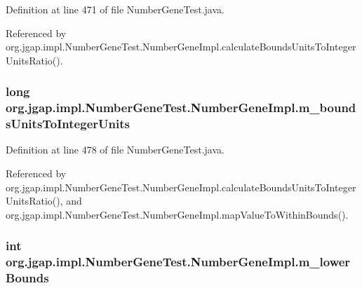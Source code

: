 Definition at line 471 of file Number\-Gene\-Test.\-java.



Referenced by org.\-jgap.\-impl.\-Number\-Gene\-Test.\-Number\-Gene\-Impl.\-calculate\-Bounds\-Units\-To\-Integer\-Units\-Ratio().

\hypertarget{classorg_1_1jgap_1_1impl_1_1_number_gene_test_1_1_number_gene_impl_a1e878330151ef32fbfe9161a431b2990}{
\subsubsection[{m\-\_\-bounds\-Units\-To\-Integer\-Units}]{\setlength{\rightskip}{0pt plus 5cm}long org.\-jgap.\-impl.\-Number\-Gene\-Test.\-Number\-Gene\-Impl.\-m\-\_\-bounds\-Units\-To\-Integer\-Units\hspace{0.3cm}{\ttfamily [private]}}}\label{classorg_1_1jgap_1_1impl_1_1_number_gene_test_1_1_number_gene_impl_a1e878330151ef32fbfe9161a431b2990}


Definition at line 478 of file Number\-Gene\-Test.\-java.



Referenced by org.\-jgap.\-impl.\-Number\-Gene\-Test.\-Number\-Gene\-Impl.\-calculate\-Bounds\-Units\-To\-Integer\-Units\-Ratio(), and org.\-jgap.\-impl.\-Number\-Gene\-Test.\-Number\-Gene\-Impl.\-map\-Value\-To\-Within\-Bounds().

\hypertarget{classorg_1_1jgap_1_1impl_1_1_number_gene_test_1_1_number_gene_impl_a253cb8ed048bd7f618c24faf492c557e}{
\subsubsection[{m\-\_\-lower\-Bounds}]{\setlength{\rightskip}{0pt plus 5cm}int org.\-jgap.\-impl.\-Number\-Gene\-Test.\-Number\-Gene\-Impl.\-m\-\_\-lower\-Bounds\hspace{0.3cm}{\ttfamily [private]}}}\label{classorg_1_1jgap_1_1impl_1_1_number_gene_test_1_1_number_gene_impl_a253cb8ed048bd7f618c24faf492c557e}



